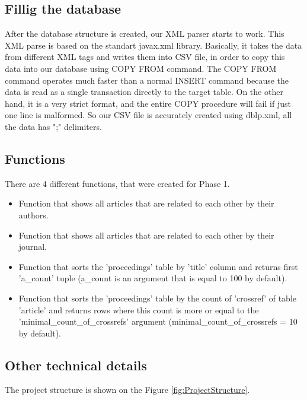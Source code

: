 \documentclass{acm_proc_article-sp}
\begin{document}
\subsection{Fillig the database}
After the database structure is created, our XML parser starts to work. This XML parse is based on the standart javax.xml library. Basically, it takes the data from different XML tags and writes them into CSV file, in order to copy this data into our database using COPY FROM command. The COPY FROM command operates much faster than a normal INSERT command because the data is read as a single transaction directly to the target table. On the other hand, it is a very strict format, and the entire COPY procedure will fail if just one line is malformed.	So our CSV file is accurately created using dblp.xml, all the data has ";" delimiters.
\subsection{Functions}
There are 4 different functions, that were created for Phase 1.
\begin{itemize}
	\item Function that shows all articles that are related to each other by their authors.
	\item Function that shows all articles that are related to each other by their journal.
	\item Function that sorts the 'proceedings' table by 'title' column and returns first 'a\_count' tuple (a\_count is an argument that is equal to 100 by default).
	\item Function that sorts the 'proceedings' table by the count of 'crossref' of table 'article' and returns rows where this count is more or equal to the 'minimal\_count\_of\_crossrefs' argument (minimal\_count\_of\_crossrefs = 10 by default).
\end{itemize}
\subsection{Other technical details}

The project structure is shown on the Figure \ref{fig:ProjectStructure}. 
\end{document}
